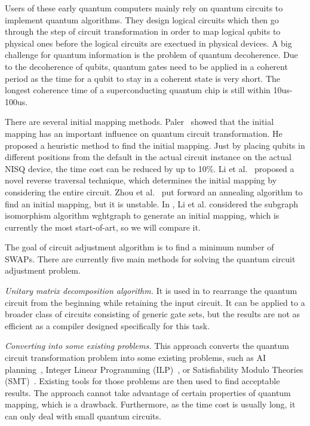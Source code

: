 \documentclass[runningheads]{llncs}
\begin{document}
Users of these early quantum computers mainly rely on quantum circuits to implement quantum algorithms. They design logical circuits which then go through the step of circuit transformation in order to map logical qubits to physical ones before the logical circuits are exectued in physical devices. A big challenge for quantum information is the problem of quantum decoherence. Due to the decoherence of qubits, quantum gates need to be applied in a coherent period as the time for a qubit to stay in a coherent state is very short. The longest coherence time of a superconducting quantum chip is still within 10us-100us. 

There are several initial mapping methods. Paler~\cite{Paler2018} showed that the initial mapping has an important influence on quantum circuit transformation. He proposed a heuristic method to find the initial mapping. Just by placing qubits in different positions from the default in the actual circuit instance on the actual NISQ device, the time cost can be reduced by up to 10\%. Li et al.~\cite{Li2018} proposed a novel reverse traversal technique, which determines the initial mapping by considering the entire circuit. Zhou et al.~\cite{Xiangzhen2020} put forward an annealing algorithm to find an initial mapping, but it is unstable. In \cite{2020Qubit}, Li et al. considered the subgraph isomorphism algorithm wghtgraph to generate an initial mapping, which is currently the most start-of-art, so we will compare it.

The goal of circuit adjustment algorithm is to find a minimum number of SWAPs. There are currently five main methods for solving the quantum circuit adjustment problem.

\emph{Unitary matrix decomposition algorithm.} It is used in \cite{2019CNOT,2019Quantum} to rearrange the quantum circuit from the beginning while retaining the input circuit. It can be applied to a broader class of circuits consisting of generic gate sets, but the results are not as efficient as a compiler designed specifically for this task.

\emph{Converting into some existing problems.} This approach converts the quantum circuit transformation problem into some existing problems, such as AI planning~\cite{2017Temporal,2018Integer}, Integer Linear Programming (ILP)~\cite{2019Almeida}, or Satisfiability Modulo Theories (SMT)~\cite{2019Murali}. Existing tools for those problems are then used to find acceptable results. The approach cannot take advantage of certain properties of quantum mapping, which is a drawback. Furthermore, as the time cost is usually long, it can only deal with small quantum circuits.
\end{document}
